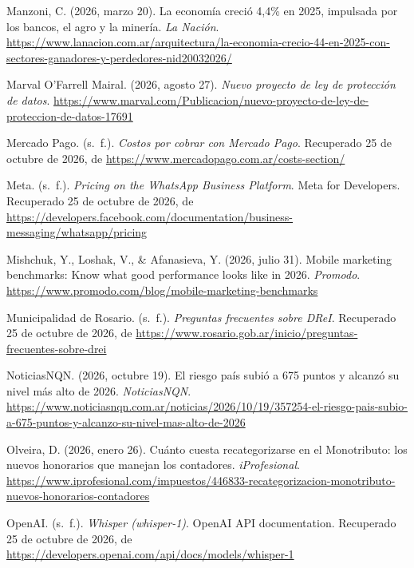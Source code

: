 \begin{CSLReferences}{1}{0}
Manzoni, C. (2026, marzo 20). La economía creció 4,4\% en 2025,
impulsada por los bancos, el agro y la minería. \emph{La Nación}.
\url{https://www.lanacion.com.ar/arquitectura/la-economia-crecio-44-en-2025-con-sectores-ganadores-y-perdedores-nid20032026/}

Marval O'Farrell Mairal. (2026, agosto 27). \emph{Nuevo proyecto de ley
de protección de datos}.
\url{https://www.marval.com/Publicacion/nuevo-proyecto-de-ley-de-proteccion-de-datos-17691}

Mercado Pago. (s.~f.). \emph{Costos por cobrar con Mercado Pago}.
Recuperado 25 de octubre de 2026, de
\url{https://www.mercadopago.com.ar/costs-section/}

Meta. (s.~f.). \emph{Pricing on the WhatsApp Business Platform}. Meta
for Developers. Recuperado 25 de octubre de 2026, de
\url{https://developers.facebook.com/documentation/business-messaging/whatsapp/pricing}

Mishchuk, Y., Loshak, V., \& Afanasieva, Y. (2026, julio 31). Mobile
marketing benchmarks: Know what good performance looks like in 2026.
\emph{Promodo}.
\url{https://www.promodo.com/blog/mobile-marketing-benchmarks}

Municipalidad de Rosario. (s.~f.). \emph{Preguntas frecuentes sobre
DReI}. Recuperado 25 de octubre de 2026, de
\url{https://www.rosario.gob.ar/inicio/preguntas-frecuentes-sobre-drei}

NoticiasNQN. (2026, octubre 19). El riesgo país subió a 675 puntos y
alcanzó su nivel más alto de 2026. \emph{NoticiasNQN}.
\url{https://www.noticiasnqn.com.ar/noticias/2026/10/19/357254-el-riesgo-pais-subio-a-675-puntos-y-alcanzo-su-nivel-mas-alto-de-2026}

Olveira, D. (2026, enero 26). Cuánto cuesta recategorizarse en el
Monotributo: los nuevos honorarios que manejan los contadores.
\emph{iProfesional}.
\url{https://www.iprofesional.com/impuestos/446833-recategorizacion-monotributo-nuevos-honorarios-contadores}

OpenAI. (s.~f.). \emph{Whisper (whisper-1)}. OpenAI API documentation.
Recuperado 25 de octubre de 2026, de
\url{https://developers.openai.com/api/docs/models/whisper-1}


\end{CSLReferences}
